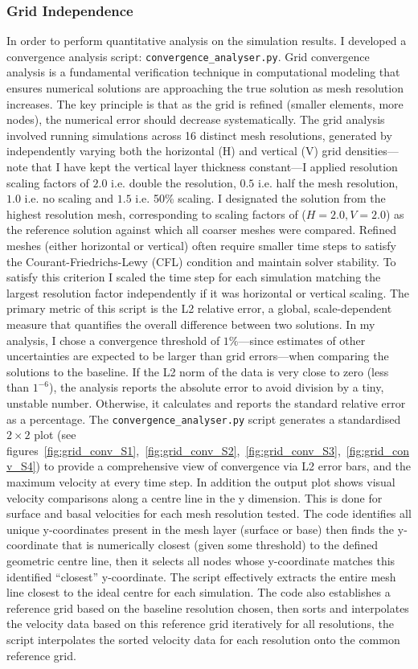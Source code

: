 \subsubsection{Grid Independence}\label{grid_ind}
In order to  perform quantitative analysis on the simulation results. I developed a convergence analysis script: \texttt{convergence\_analyser.py}.
Grid convergence analysis is a fundamental verification technique in computational modeling that ensures numerical solutions are approaching the true solution as mesh resolution increases. The key principle is that as the grid is refined (smaller elements, more nodes), the numerical error should decrease systematically.
The grid analysis involved running simulations across 16 distinct mesh resolutions, generated by independently varying both the horizontal (H) and vertical (V) grid densities—note that I have kept the vertical layer thickness constant—I applied resolution scaling factors of $2.0$ i.e. double the resolution, $0.5$ i.e. half the mesh resolution, $1.0$ i.e. no scaling and $1.5$ i.e. 50\% scaling. I designated the solution from the highest resolution mesh, corresponding to scaling factors of ($H=2.0, V=2.0$) as the reference solution against which all coarser meshes were compared. Refined meshes (either horizontal or vertical) often require smaller time steps to satisfy the Courant-Friedrichs-Lewy (CFL) condition and maintain solver stability. To satisfy this criterion I scaled the time step for each simulation matching the largest resolution factor independently if it was horizontal or vertical scaling.
The primary metric of this script is the L2 relative error, a global, scale-dependent measure that quantifies the overall difference between two solutions. In my analysis, I chose a convergence threshold of $1\%$—since estimates of other uncertainties are expected to be larger than grid errors—when comparing the solutions to the baseline. If the L2 norm of the data is very close to zero (less than $1^{-6}$), the analysis reports the absolute error to avoid division by a tiny, unstable number. Otherwise, it calculates and reports the standard relative error as a percentage.
The \texttt{convergence\_analyser.py} script generates a standardised $2\times2$ plot (see figures~\ref{fig:grid_conv_S1},~\ref{fig:grid_conv_S2},~\ref{fig:grid_conv_S3},~\ref{fig:grid_conv_S4}) to provide a comprehensive view of convergence via L2 error bars, and the maximum velocity at every time step. In addition the output plot shows visual velocity comparisons along a centre line in the y dimension. This is done for surface and basal velocities for each mesh resolution tested. The code identifies all unique y-coordinates present in the mesh layer (surface or base) then finds the y-coordinate that is numerically closest (given some threshold) to the defined geometric centre line, then it selects all nodes whose y-coordinate matches this identified ``closest'' y-coordinate. The script effectively extracts the entire mesh line closest to the ideal centre for each simulation. The code also establishes a reference grid based on the baseline resolution chosen, then sorts and interpolates the velocity data based on this reference grid iteratively for all resolutions, the script interpolates the sorted velocity data for each resolution onto the common reference grid. 

